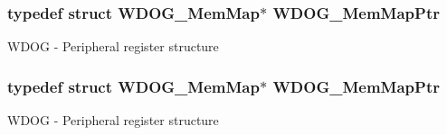 \subsubsection[{\texorpdfstring{W\+D\+O\+G\+\_\+\+Mem\+Map\+Ptr}{WDOG_MemMapPtr}}]{\setlength{\rightskip}{0pt plus 5cm}typedef struct {\bf W\+D\+O\+G\+\_\+\+Mem\+Map}$\ast$ {\bf W\+D\+O\+G\+\_\+\+Mem\+Map\+Ptr}}\hypertarget{group___w_d_o_g___peripheral_gaed99974fa14a19f21a8770728ff09af3}{}\label{group___w_d_o_g___peripheral_gaed99974fa14a19f21a8770728ff09af3}
W\+D\+OG -\/ Peripheral register structure 
\subsubsection[{\texorpdfstring{W\+D\+O\+G\+\_\+\+Mem\+Map\+Ptr}{WDOG_MemMapPtr}}]{\setlength{\rightskip}{0pt plus 5cm}typedef struct {\bf W\+D\+O\+G\+\_\+\+Mem\+Map}$\ast$ {\bf W\+D\+O\+G\+\_\+\+Mem\+Map\+Ptr}}\hypertarget{group___w_d_o_g___peripheral_gaed99974fa14a19f21a8770728ff09af3}{}\label{group___w_d_o_g___peripheral_gaed99974fa14a19f21a8770728ff09af3}
W\+D\+OG -\/ Peripheral register structure 